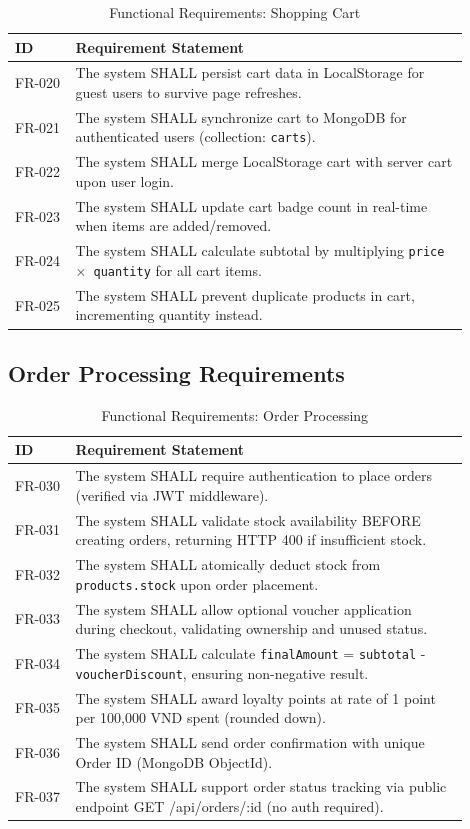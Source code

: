 \documentclass[12pt, a4paper]{report}
\begin{document}
\begin{table}[H]
\centering
\caption{Functional Requirements: Shopping Cart}
\label{tab:fr_cart}
\small
\begin{tabular}{@{}p{0.12\linewidth}p{0.78\linewidth}@{}}
\toprule
\textbf{ID} & \textbf{Requirement Statement} \\
\midrule
FR-020 & The system SHALL persist cart data in LocalStorage for guest users to survive page refreshes. \\
FR-021 & The system SHALL synchronize cart to MongoDB for authenticated users (collection: \texttt{carts}). \\
FR-022 & The system SHALL merge LocalStorage cart with server cart upon user login. \\
FR-023 & The system SHALL update cart badge count in real-time when items are added/removed. \\
FR-024 & The system SHALL calculate subtotal by multiplying \texttt{price $\times$ quantity} for all cart items. \\
FR-025 & The system SHALL prevent duplicate products in cart, incrementing quantity instead. \\
\bottomrule
\end{tabular}
\end{table}

\subsection{Order Processing Requirements}

\begin{table}[H]
\centering
\caption{Functional Requirements: Order Processing}
\label{tab:fr_orders}
\small
\begin{tabular}{@{}p{0.12\linewidth}p{0.78\linewidth}@{}}
\toprule
\textbf{ID} & \textbf{Requirement Statement} \\
\midrule
FR-030 & The system SHALL require authentication to place orders (verified via JWT middleware). \\
FR-031 & The system SHALL validate stock availability BEFORE creating orders, returning HTTP 400 if insufficient stock. \\
FR-032 & The system SHALL atomically deduct stock from \texttt{products.stock} upon order placement. \\
FR-033 & The system SHALL allow optional voucher application during checkout, validating ownership and unused status. \\
FR-034 & The system SHALL calculate \texttt{finalAmount} = \texttt{subtotal} - \texttt{voucherDiscount}, ensuring non-negative result. \\
FR-035 & The system SHALL award loyalty points at rate of 1 point per 100,000 VND spent (rounded down). \\
FR-036 & The system SHALL send order confirmation with unique Order ID (MongoDB ObjectId). \\
FR-037 & The system SHALL support order status tracking via public endpoint GET /api/orders/:id (no auth required). \\
\bottomrule
\end{tabular}
\end{table}
\end{document}
